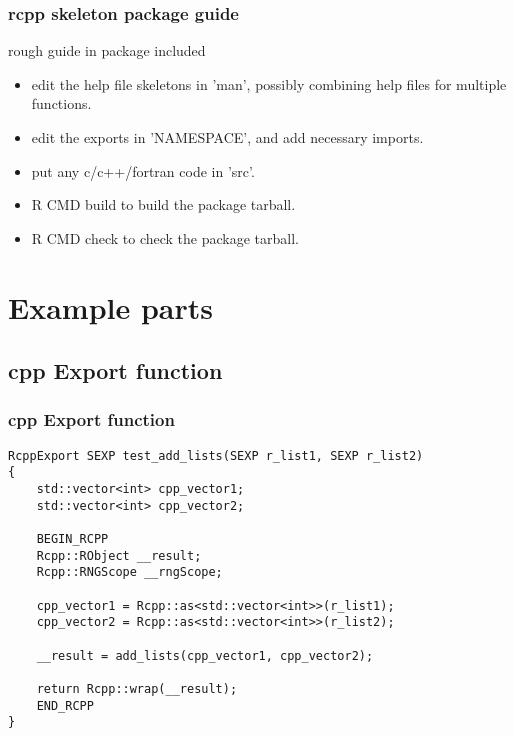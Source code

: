 \documentclass[hyperef={
    colorlinks=true,
    linkcolor=blue,
    filecolor=black,
urlcolor=blue}
]{beamer}
\begin{document}
\begin{frame}
    \frametitle{rcpp skeleton package guide}
    rough guide in package included
\begin{itemize}
\item edit the help file skeletons in 'man', possibly combining help files
  for multiple functions.
\item edit the exports in 'NAMESPACE', and add necessary imports.
\item put any c/c++/fortran code in 'src'.
\item R CMD build to build the package tarball.
\item R CMD check to check the package tarball.
\end{itemize}
\end{frame}

\section{Example parts}
\subsection{cpp Export function}
\begin{frame}[fragile]
\frametitle{cpp Export function}
\begin{verbatim}
RcppExport SEXP test_add_lists(SEXP r_list1, SEXP r_list2)
{        
    std::vector<int> cpp_vector1;
    std::vector<int> cpp_vector2;
        
    BEGIN_RCPP 
    Rcpp::RObject __result;
    Rcpp::RNGScope __rngScope;

    cpp_vector1 = Rcpp::as<std::vector<int>>(r_list1);
    cpp_vector2 = Rcpp::as<std::vector<int>>(r_list2);
    
    __result = add_lists(cpp_vector1, cpp_vector2);
    
    return Rcpp::wrap(__result);
    END_RCPP
}
\end{verbatim}
\end{frame}

\end{document}
